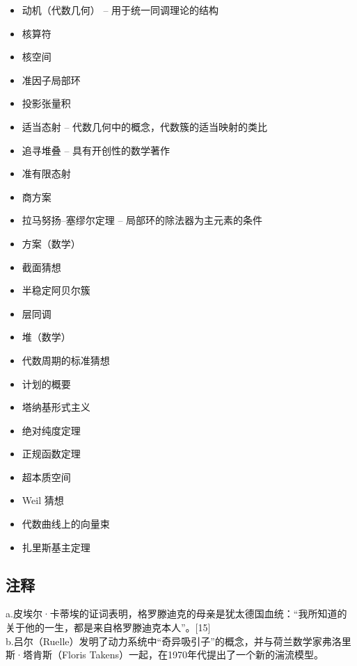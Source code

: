 \begin{itemize}
\item 动机（代数几何） – 用于统一同调理论的结构  
\item 核算符  
\item 核空间  
\item 准因子局部环  
\item 投影张量积 
\item 适当态射 – 代数几何中的概念，代数簇的适当映射的类比  
\item 追寻堆叠 – 具有开创性的数学著作  
\item 准有限态射 
\item 商方案 
\item 拉马努扬–塞缪尔定理 – 局部环的除法器为主元素的条件  
\item 方案（数学）  
\item 截面猜想  
\item 半稳定阿贝尔簇
\item 层同调 
\item 堆（数学） 
\item 代数周期的标准猜想 
\item 计划的概要 
\item 塔纳基形式主义 
\item 绝对纯度定理 
\item 正规函数定理 
\item 超本质空间  
\item Weil 猜想  
\item 代数曲线上的向量束  
\item 扎里斯基主定理
\end{itemize}
\subsection{注释} 
a.皮埃尔·卡蒂埃的证词表明，格罗滕迪克的母亲是犹太德国血统：“我所知道的关于他的一生，都是来自格罗滕迪克本人”。[15]\\ 
b.吕尔（Ruelle）发明了动力系统中“奇异吸引子”的概念，并与荷兰数学家弗洛里斯·塔肯斯（Floris Takens）一起，在1970年代提出了一个新的湍流模型。
